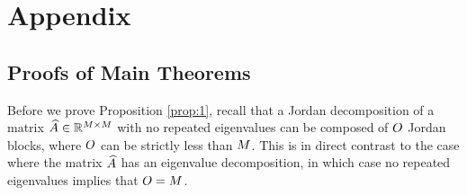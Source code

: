 \section{Appendix}
\subsection{Proofs of Main Theorems}

Before we prove Proposition \ref{prop:1}, recall that a Jordan decomposition of a matrix $\widehat{A}\in\mathbb{R}^{M\times M}$ with no repeated eigenvalues can be composed of $O$ Jordan blocks, where $O$ can be strictly less than $M$. This is in direct contrast to the case where the matrix $\widehat{A}$ has an eigenvalue decomposition, in which case no repeated eigenvalues implies that $O = M$.  
